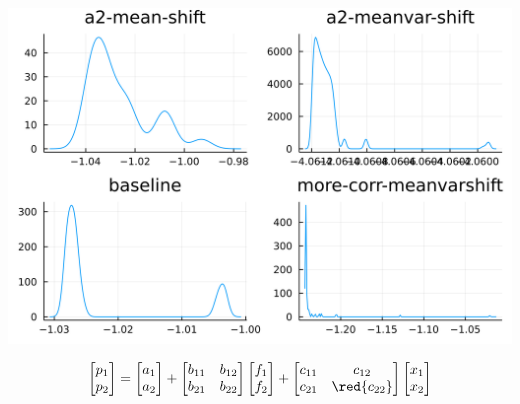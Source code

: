 \documentclass[
  ignorenonframetext,
]{beamer}
\begin{document}
\begin{frame}{}
\protect\hypertarget{section-10}{}
\begin{center}\includegraphics[width=0.95\paperheight]{complexity_files/figure-beamer/unnamed-chunk-32-1} \end{center}

\[
\begin{bmatrix}
 p_1 \\ p_2
\end{bmatrix} =
\begin{bmatrix}
 a_1 \\ {a_2}
\end{bmatrix}
 + 
 \begin{bmatrix}
 {b_{11}} & b_{12} \\
 {b_{21}} & {b_{22}}
\end{bmatrix}
\begin{bmatrix}
 f_1 \\ f_2
\end{bmatrix}
+
 \begin{bmatrix}
 {c_{11}} & c_{12} \\
 c_{21} & \red{c_{22}}
\end{bmatrix} 
\begin{bmatrix}
 x_1 \\ x_2
\end{bmatrix}
\]
\end{frame}
\end{document}
